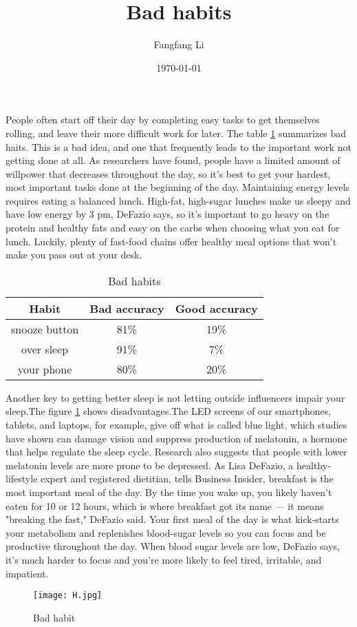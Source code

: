 \documentclass[a4paper]{article}
\title{Bad habits}
\author{Fangfang Li}
\date{\today}
\begin{document}
\maketitle
People often start off their day by completing easy tasks to get themselves rolling, and leave their more difficult work for later. The table \ref{tab1} summarizes bad haits. This is a bad idea, and one that frequently leads to the important work not getting done at all. As researchers have found, people have a limited amount of willpower that decreases throughout the day, so it's best to get your hardest, most important tasks done at the beginning of the day. Maintaining energy levels requires eating a balanced lunch. High-fat, high-sugar lunches make us sleepy and have low energy by 3 pm, DeFazio says, so it's important to go heavy on the protein and healthy fats and easy on the carbs when choosing what you eat for lunch. Luckily, plenty of fast-food chains offer healthy meal options that won't make you pass out at your desk.\\

\begin{table}[T]
\centering
\caption{Bad habits}
\begin{tabular}{|c|c|c|}
 \hline
Habit & Bad accuracy & Good accuracy \\ \hline
snooze button & 81\% & 19\% \\ \hline
over sleep & 91\% &7\% \\ \hline
your phone & 80\% & 20\% \\ \hline
             \end{tabular}
             \label{tab1}
\end{table}
Another key to getting better sleep is not letting outside influencers impair your sleep.The figure \ref{1} shows disadvantages.The LED screens of our smartphones, tablets, and laptops, for example, give off what is called blue light, which studies have shown can damage vision and suppress production of melatonin, a hormone that helps regulate the sleep cycle. Research also suggests that people with lower melatonin levels are more prone to be depressed. As Lisa DeFazio, a healthy-lifestyle expert and registered dietitian, tells Business Insider, breakfast is the most important meal of the day. By the time you wake up, you likely haven't eaten for 10 or 12 hours, which is where breakfast got its name — it means "breaking the fast," DeFazio said. Your first meal of the day is what kick-starts your metabolism and replenishes blood-sugar levels so you can focus and be productive throughout the day. When blood sugar levels are low, DeFazio says, it's much harder to focus and you're more likely to feel tired, irritable, and impatient. \\
\begin{figure}[T]
\centering
\texttt{[image: H.jpg]}
\caption{Bad habit}
\label{1}
\end{figure}
\end{document}
